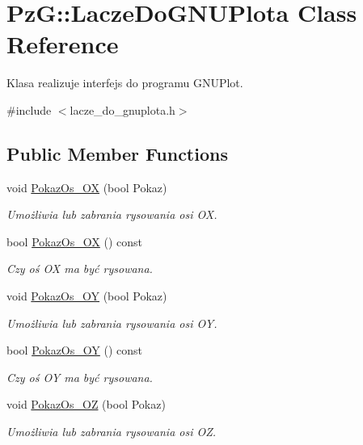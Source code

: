 \hypertarget{classPzG_1_1LaczeDoGNUPlota}{}\section{PzG\+:\+:Lacze\+Do\+G\+N\+U\+Plota Class Reference}
\label{classPzG_1_1LaczeDoGNUPlota}


Klasa realizuje interfejs do programu G\+N\+U\+Plot.  




{\ttfamily \#include $<$lacze\+\_\+do\+\_\+gnuplota.\+h$>$}

\subsection*{Public Member Functions}
\begin{DoxyCompactItemize}
\item 
void \hyperlink{classPzG_1_1LaczeDoGNUPlota_a11421d7c67deab6b7524cc492407e897}{Pokaz\+Os\+\_\+\+OX} (bool Pokaz)
\begin{DoxyCompactList}\small\item\em Umożliwia lub zabrania rysowania osi OX. \end{DoxyCompactList}\item 
bool \hyperlink{classPzG_1_1LaczeDoGNUPlota_ae112972af57167c3b053bf922bce6bbf}{Pokaz\+Os\+\_\+\+OX} () const
\begin{DoxyCompactList}\small\item\em Czy oś OX ma być rysowana. \end{DoxyCompactList}\item 
void \hyperlink{classPzG_1_1LaczeDoGNUPlota_a7c3db909b266fc30808e86406c04b516}{Pokaz\+Os\+\_\+\+OY} (bool Pokaz)
\begin{DoxyCompactList}\small\item\em Umożliwia lub zabrania rysowania osi OY. \end{DoxyCompactList}\item 
bool \hyperlink{classPzG_1_1LaczeDoGNUPlota_a7298f469f6932f5c808dcf620650b4b8}{Pokaz\+Os\+\_\+\+OY} () const
\begin{DoxyCompactList}\small\item\em Czy oś OY ma być rysowana. \end{DoxyCompactList}\item 
void \hyperlink{classPzG_1_1LaczeDoGNUPlota_a9fabfe88cb1801a5de8923f45f514b99}{Pokaz\+Os\+\_\+\+OZ} (bool Pokaz)
\begin{DoxyCompactList}\small\item\em Umożliwia lub zabrania rysowania osi OZ. \end{DoxyCompactList}\item 

\end{DoxyCompactItemize}
